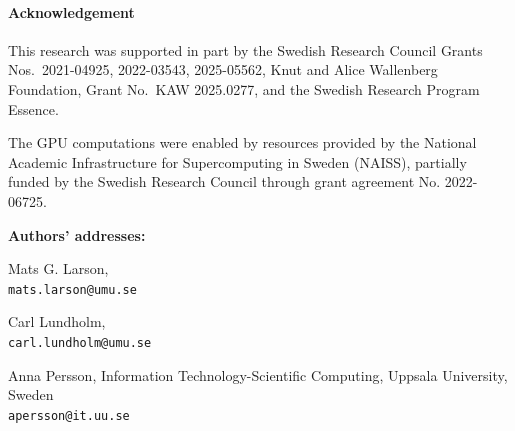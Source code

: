 \documentclass[12pt]{article}
\begin{document}
\bigskip
\paragraph{Acknowledgement} This research was supported in part by the Swedish Research Council
Grants Nos.\ 2021-04925, 2022-03543, 2025-05562, Knut and Alice Wallenberg Foundation,
Grant No.\ KAW 2025.0277, and the Swedish Research Program Essence.

The GPU computations were enabled by resources provided by the National Academic Infrastructure for Supercomputing in Sweden (NAISS), partially funded by the Swedish Research Council through grant agreement No. 2022-06725.


\footnotesize{

}

\bigskip
\bigskip
\noindent
\footnotesize {\bf Authors' addresses:}

\smallskip
\noindent

\smallskip
\noindent
Mats G. Larson,  \quad \hfill \addressumushort\\
{\tt mats.larson@umu.se}

\smallskip
\noindent
Carl Lundholm, \quad \hfill \addressumushort\\
{\tt carl.lundholm@umu.se}

\smallskip
\noindent
Anna Persson, \quad \hfill Information Technology-Scientific Computing,  Uppsala University, Sweden\\
{\tt apersson@it.uu.se}
\end{document}
